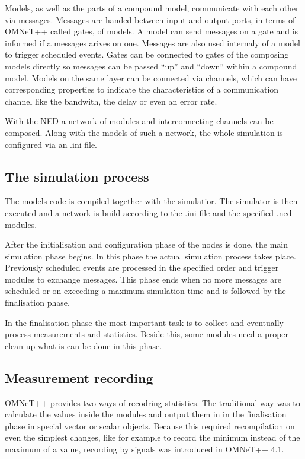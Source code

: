 Models, as well as the parts of a compound model, communicate with each other via messages. Messages are handed between input and output ports, in terms of OMNeT++ called gates, of models. A model can send messages on a gate and is informed if a messages arives on one. Messages are also used internaly of a model to trigger scheduled events. Gates can be connected to gates of the composing models directly so messages can be passed ``up'' and ``down'' within a compound model. Models on the same layer can be connected via channels, which can have corresponding properties to indicate the characteristics of a communication channel like the bandwith, the delay or even an error rate.

With the NED a network of modules and interconnecting channels can be composed. Along with the models of such a network, the whole simulation is configured via an .ini file.

\subsection{The simulation process}

The models code is compiled together with the simulatior. The simulator is then executed and a network is build according to the .ini file and the specified .ned modules.

After the initialisation and configuration phase of the nodes is done, the main simulation phase begins. In this phase the actual simulation process takes place. Previously scheduled events are processed in the specified order and trigger modules to exchange messages. This phase ends when no more messages are scheduled or on exceeding a maximum simulation time and is followed by the finalisation phase.

In the finalisation phase the most important task is to collect and eventually process measurements and statistics. Beside this, some modules need a proper clean up what is can be done in this phase.

\subsection{Measurement recording}

OMNeT++ provides two ways of recodring statistics. The traditional way was to calculate the values inside the modules and output them in in the finalisation phase in special vector or scalar objects. Because this required recompilation on even the simplest changes, like for example to record the minimum instead of the maximum of a value, recording by signals was introduced in OMNeT++ 4.1.

